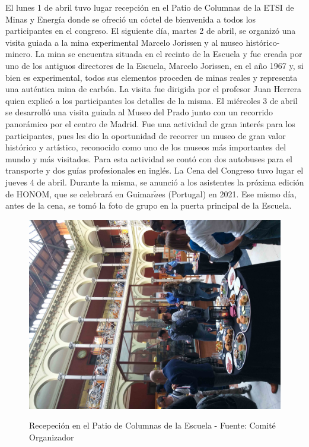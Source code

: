 \documentclass[twoside]{article}
\begin{document}
El lunes 1 de abril tuvo lugar recepción en el Patio de Columnas de la ETSI de Minas y Energía donde se ofreció un cóctel de bienvenida a todos los participantes en el congreso. El siguiente día, martes 2 de abril, se organizó una visita guiada a la mina experimental Marcelo Jorissen y al museo histórico-minero. La mina se encuentra situada en el recinto de la Escuela y fue creada por uno de los antiguos directores de la Escuela, Marcelo Jorissen, en el año 1967 y, si bien es experimental, todos sus elementos proceden de minas reales y representa una auténtica mina de carbón. La visita fue dirigida por el profesor Juan Herrera quien explicó a los participantes los detalles de la misma. El miércoles 3 de abril se desarrolló una visita guiada al Museo del Prado junto con un recorrido panorámico por el centro de Madrid. Fue una actividad de gran interés para los participantes, pues les dio la oportunidad de recorrer un museo de gran valor histórico y artístico, reconocido como uno de los museos más importantes del mundo y más visitados. Para esta actividad se contó con dos autobuses para el transporte y dos guías profesionales en inglés. La Cena del Congreso tuvo lugar el jueves 4 de abril. Durante la misma, se anunció a los asistentes la próxima edición de HONOM, que se celebrará en Guimar$\tilde{a}$es (Portugal) en 2021. Ese mismo día, antes de la cena, se tomó la foto de grupo en la puerta principal de la Escuela. 
%
\begin{center}
\begin{figure}
	\centering
		\includegraphics[width=.95\textwidth, angle=270]{Recepcion}
	\label{fig:RecepcionFoto}
	\caption{Recepeción en el Patio de Columnas de la Escuela - Fuente: Comité Organizador}
\end{figure}
\end{center}
\end{document}
